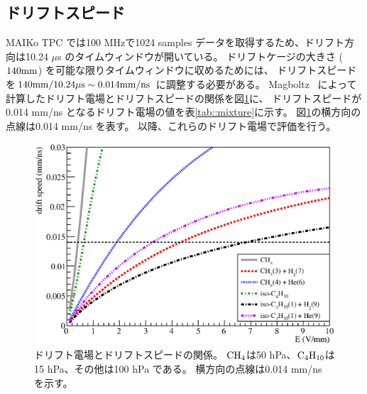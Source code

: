 \subsection{ドリフトスピード}
MAIKo TPC では100 MHzで1024 samples データを取得するため、ドリフト方向は10.24 $\mu$s のタイムウィンドウが開いている。
ドリフトケージの大きさ ($140\rm{mm}$) を可能な限りタイムウィンドウに収めるためには、
ドリフトスピードを$140\rm{mm}/10.24\rm{\mu s} \sim 0.014\rm{mm/ns}$ に調整する必要がある。
Magboltz~\cite{magboltz} によって計算したドリフト電場とドリフトスピードの関係を図\ref{fig::drift_v_magboltz}に、
ドリフトスピードが0.014 mm/ns となるドリフト電場の値を表\ref{tab::mixture}に示す。
図\ref{fig::drift_v_magboltz}の横方向の点線は0.014 mm/ns を表す。
以降、これらのドリフト電場で評価を行う。
\begin{figure}
  \centering
  \includegraphics[clip, width=0.9\columnwidth]{eps/drift_v_magboltz.eps}
  \caption[ドリフト電場とドリフトスピードの関係。]
          {ドリフト電場とドリフトスピードの関係。
            ${\rm CH_{4}}$は50 hPa、${\rm C_{4}H_{10}}$は15 hPa、その他は100 hPa である。
          横方向の点線は0.014 mm/ns を示す。}
  \label{fig::drift_v_magboltz}
\end{figure}

